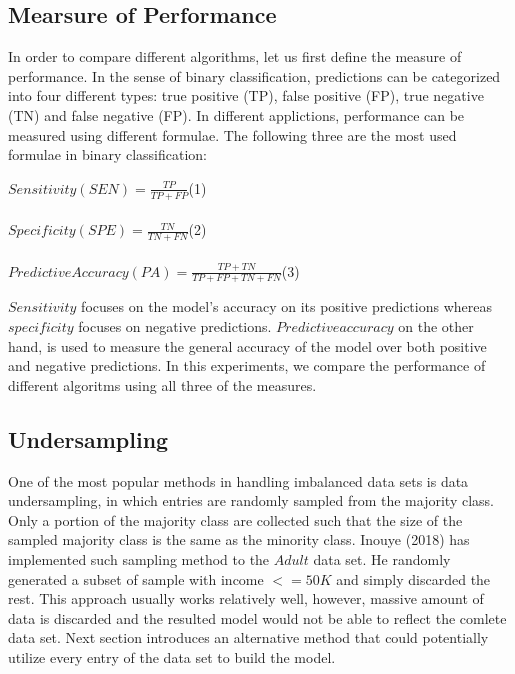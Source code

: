 \documentclass{article}
\begin{document}
\subsection{Mearsure of Performance}
\label{measure_of_performance}

In order to compare different algorithms, let us first define the measure of performance. In the sense of binary classification, predictions can be categorized into four different types: true positive (TP), false positive (FP), true negative (TN) and false negative (FP). In different applictions, performance can be measured using different formulae. The following three are the most used formulae in binary classification:\\
\begin{center}
\hfill$Sensitivity (SEN)=\frac{TP}{TP+FP}$\hfill (1)\\\hfill\\
\hfill$Specificity (SPE)=\frac{TN}{TN+FN}$\hfill (2)\\\hfill\\
\hfill$Predictive Accuracy (PA)=\frac{TP+TN}{TP+FP+TN+FN}$\hfill (3)\\
\end{center}
$Sensitivity$ focuses on the model's accuracy on its positive predictions whereas $specificity$ focuses on negative predictions. $Predictive accuracy$ on the other hand, is used to measure the general accuracy of the model over both positive and negative predictions. In this experiments, we compare the performance of different algoritms using all three of the measures.

\subsection{Undersampling}
\label{undersampling}

One of the most popular methods in handling imbalanced data sets is data undersampling, in which entries are randomly sampled from the majority class. Only a portion of the majority class are collected such that the size of the sampled majority class is the same as the minority class. Inouye (2018) has implemented such sampling method to the $Adult$ data set. He randomly generated a subset of sample with income $<=50K$ and simply discarded the rest. This approach usually works relatively well, however, massive amount of data is discarded and the resulted model would not be able to reflect the comlete data set. Next section introduces an alternative method that could potentially utilize every entry of the data set to build the model.
\end{document}
